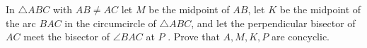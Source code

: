 In $\triangle ABC$ with $AB\neq{AC}$ let $M$ be the midpoint of $AB$, let $K$ be the midpoint of the arc $BAC$ in the circumcircle of $\triangle ABC$, and let the perpendicular bisector of $AC$ meet the bisector of $\angle BAC$ at $P$ . Prove that $A, M, K, P$ are concyclic.